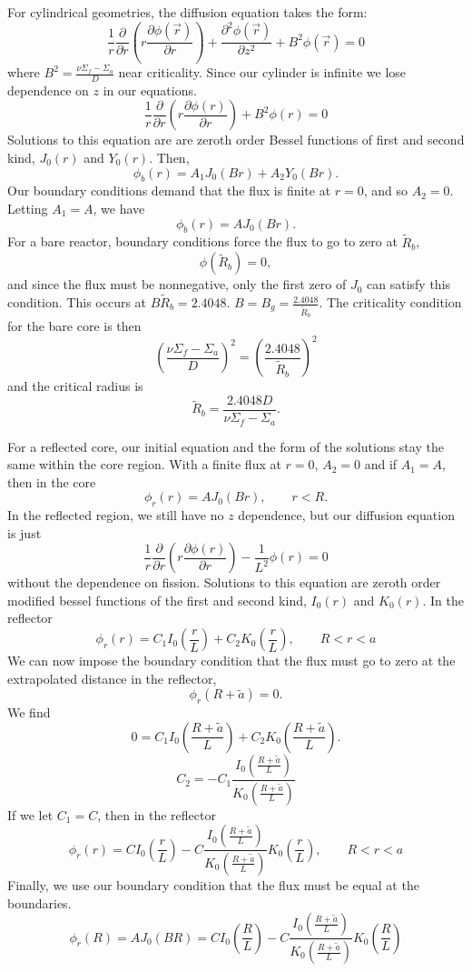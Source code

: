 \documentclass{article}
\newcommand{\p}{\partial}
\newcommand{\Xs}{\Sigma}
\newcommand{\pos}{\vec{r}}
\begin{document}
For cylindrical geometries, the diffusion equation takes the form:
$$ \frac{1}{r}\frac{\p}{\p r}\left(r \frac{\p \phi(\pos)}{\p r}\right) + \frac{\p^2 \phi(\pos)}{\p z^2} + B^2\phi(\pos) = 0$$
where $B^2 = \frac{\nu\Sigma_f - \Sigma_a}{D} $ near criticality. 
Since our cylinder is infinite we lose dependence on $z$ in our equations.
$$ \frac{1}{r}\frac{\p}{\p r}\left(r \frac{\p \phi(r)}{\p r}\right) + B^2\phi(r) = 0$$
Solutions to this equation are are zeroth order Bessel functions of first and second kind, $J_0(r)$ and $Y_0(r)$. 
Then,
$$ \phi_b(r) = A_1 J_0(B r) + A_2 Y_0(B r) .$$
Our boundary conditions demand that the flux is finite at $r = 0$, and so $A_2 = 0$. 
Letting $A_1 = A$, we have
$$ \phi_b(r) = A J_0(B r) .$$
For a bare reactor, boundary conditions force the flux to go to zero at $\tilde{R}_b$,
$$ \phi(\tilde{R}_b) = 0 ,$$
and since the flux must be nonnegative, only the first zero of $J_0$ can satisfy this condition. This occurs at $B \tilde{R}_b = 2.4048$. $B = B_g = \frac{2.4048}{\tilde{R}_b}$. The criticality condition for the bare core is then 
$$ \left(\frac{\nu\Xs_f - \Xs_a}{D}\right)^2 = \left(\frac{2.4048}{\tilde{R}_b}\right)^2 $$
and the critical radius is
$$ \tilde{R}_b = \frac{2.4048 D}{\nu\Sigma_f - \Sigma_a} .$$

For a reflected core, our initial equation and the form of the solutions stay the same within the core region. 
With a finite flux at $r=0$, $A_2 = 0$ and if $A_1 = A$, then in the core 
$$ \phi_{r}(r) = A J_0(B r), \qquad r<R.$$
In the reflected region, we still have no $z$ dependence, but our diffusion equation is just
$$ \frac{1}{r}\frac{\p}{\p r}\left(r \frac{\p \phi(r)}{\p r}\right) - \frac{1}{L^2}\phi(r) = 0$$
without the dependence on fission. Solutions to this equation are zeroth order modified bessel functions of the first and second kind, $I_0(r)$ and $K_0(r)$.
In the reflector
$$ \phi_{r}(r) = C_1 I_0(\frac{r}{L}) + C_2 K_0(\frac{r}{L}), \qquad R<r<a$$
We can now impose the boundary condition that the flux must go to zero at the extrapolated distance in the reflector,
$$ \phi_{r}(R+\tilde{a}) = 0 .$$
We find
$$ 0 = C_1 I_0(\frac{R+\tilde{a}}{L}) + C_2 K_0(\frac{R+\tilde{a}}{L}) .$$
$$ C_2 = -C_1 \frac{I_0(\frac{R+\tilde{a}}{L})}{K_0(\frac{R+\tilde{a}}{L})} $$
If we let $C_1 = C$, then in the reflector
$$ \phi_{r}(r) = C I_0(\frac{r}{L}) - C \frac{I_0(\frac{R+\tilde{a}}{L})}{K_0(\frac{R+\tilde{a}}{L})} K_0(\frac{r}{L}), \qquad R<r<a$$
Finally, we use our boundary condition that the flux must be equal at the boundaries.
$$ \phi_{r}(R) = A J_0(B R) = C I_0(\frac{R}{L}) - C \frac{I_0(\frac{R+\tilde{a}}{L})}{K_0(\frac{R+\tilde{a}}{L})} K_0(\frac{R}{L}) $$
\end{document}
